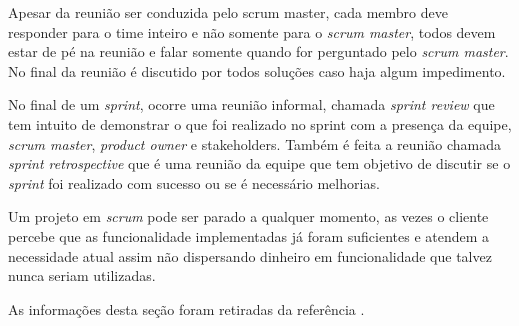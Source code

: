 \documentclass{abnt}
\begin{document}
			Apesar da reunião ser conduzida pelo scrum master, cada membro deve responder para o time inteiro e não somente para o
			\emph{scrum master}, todos devem estar de pé na reunião e falar somente quando for perguntado pelo \emph{scrum master}. No final da
			reunião é discutido por todos soluções caso haja algum impedimento.
			
			No final de um \emph{sprint}, ocorre uma reunião informal, chamada \emph{sprint review} que tem intuito de demonstrar o que foi 
			realizado no sprint com a presença da equipe, \emph{scrum master}, \emph{product owner} e stakeholders. Também é feita a reunião chamada \emph{sprint retrospective}
			que é uma reunião da equipe que tem objetivo de discutir se o \emph{sprint} foi realizado com sucesso ou se é necessário melhorias.
			
			Um projeto em \emph{scrum} pode ser parado a qualquer momento, as vezes o cliente percebe que as funcionalidade implementadas já foram
			suficientes e atendem a necessidade atual assim não dispersando dinheiro em funcionalidade que talvez nunca seriam utilizadas.
			
			As informações desta seção foram retiradas da referência \cite{SCRUMEPF}.
	
\end{document}
